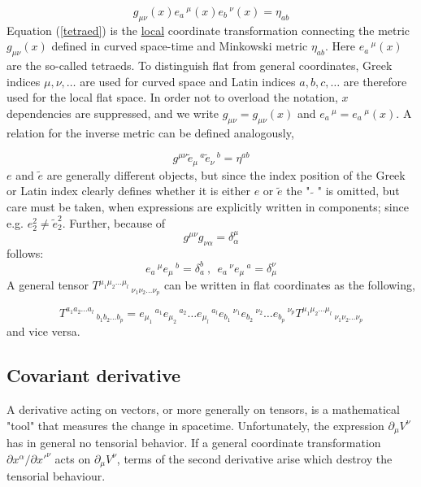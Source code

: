 \documentclass[12pt,a4paper]{article}
\begin{document}
	\begin{equation}
		\label{tetraed}
		g_{\mu \nu}(x)  e_a\,^{\mu}(x) e_b\,^{\nu}(x) = \eta_{a b}
	\end{equation}
	Equation (\ref{tetraed}) is the \underline{local} coordinate transformation connecting the metric $g_{\mu \nu}(x) $ defined in curved space-time and  Minkowski metric $\eta_{ab}$. Here $e_a\,^\mu(x)$ are the so-called tetraeds. To distinguish flat from general coordinates, Greek indices $\mu,\nu,\ldots$ are used for curved space and
	Latin indices $a,b,c,\ldots$ are therefore used for the local flat space. In order not to overload the notation, $x$ dependencies are suppressed, and we write $g_{\mu\nu} = g_{\mu\nu}(x)$ and $e_a\,^{ \mu } = e_a\,^{ \mu}(x)$.
	A relation for the inverse metric can be defined analogously,
	
	
	\begin{equation}
		\label{tetraed}
		g^{\mu \nu}  \tilde{e}_\mu\,^{a} \tilde{e}_\nu\,^{b} = \eta^{a b}
	\end{equation}
	 $e$ and $\tilde{e}$ are generally different objects, but since the index position of the Greek or Latin index clearly defines whether it is either $e$ or $\tilde{e}$ the " $\tilde{}$ " is omitted, but care must be taken, when expressions are explicitly written in components; since e.g. $e^2_2 \neq \tilde{e}^2_2$.
	Further, because of
	$$g^{\mu\nu}g_{\nu\alpha}=\delta^\mu_\alpha$$
	follows: 
	$$
	e_a\,^{\mu}e_\mu\,^{b} = \delta_a^b \ , \ \ e_a\,^{\nu} e_\mu\,^{a} = \delta_\mu^\nu
	$$
	A general tensor $T^{\mu_1 \mu_2 \ldots \mu_l}\,_{\nu_1 \nu_2 \ldots \nu_p}$ can be written in flat coordinates as the following,
	
	

	\begin{equation}
		T^{a_1 a_2 \ldots a_l}\,_{b_1 b_2 \ldots b_p} =  e_{\mu_1}\,^{ a_1} e_{\mu_2}\,^{a_2} \ldots e_{\mu_l}\,^{a_l} e_{b_1}\,^{ \nu_1} e_{b_2}\,^{\nu_2} \ldots e_{b_p}\,^{\nu_p} T^{\mu_1 \mu_2 \ldots \mu_l}\,_{ \nu_1 \nu_2 \ldots \nu_p}
	\end{equation}
	and vice versa.
	
	\subsection{Covariant derivative}
	A derivative acting on vectors, or more generally on tensors, is a mathematical "tool" that measures the change in spacetime. Unfortunately, the expression $\partial_\mu V^\nu$ has in general no tensorial behavior. If a general coordinate transformation $\partial x^\alpha/ \partial x'^\nu$ acts on $\partial_\mu V^\nu$, terms of the second derivative arise which destroy the tensorial behaviour.
	 
\end{document}
